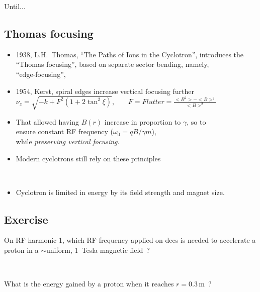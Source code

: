   Until...

\subsection{Thomas focusing}

\begin{itemize}
\item[\bull]  1938, L.H.~Thomas, ``The Paths of Ions in the Cyclotron'', 
introduces the \\
 ``Thomas focusing'', based on separate sector bending, namely,  \\
``edge-focusing'', 
\item[\bull]  1954, Kerst, spiral edges increase vertical focusing further \\
$\nu_z = \sqrt{-k + F^2(1 + 2 \tan^2 \xi)}$, ~ ~ $F=Flutter = \frac{<B^2> - <B>^2}{<B>^2}$
\item[\bull]  That allowed having $B(r)$ increase in proportion to $\gamma$, so to \\ 
ensure constant RF frequency  ($\omega_0 = qB / \gamma m$), \\
while {\it preserving vertical focusing}.  

\item[\bull]  Modern cyclotrons still rely on these principles


\vspace{0mm}

~

\item[\bull] Cyclotron is limited in energy by its field strength and magnet size. 
\end{itemize}




\subsection*{Exercise}


{
On RF harmonic 1, which RF frequency applied on dees 
is needed to accelerate a proton in a $\sim$uniform, 1~Tesla magnetic field~? 

~

What is the  energy gained by a proton when it reaches $r=0.3\,$m~?
}


